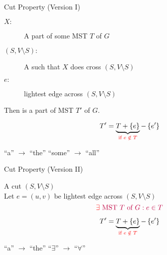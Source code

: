 
\begin{frame}{}
  \centerline{}
\end{frame}

\begin{frame}{}
  \begin{exampleblock}{Cut Property (Version I)}
    \begin{description}
      \item[$X:$] A part of some MST $T$ of $G$
      \item[$(S, V \setminus S):$] A  such that $X$ does  cross $(S, V \setminus S)$
    ­ \item[$e:$]  lightest edge across $(S, V \setminus S)$
    \end{description}

    \pause
    \vspace{0.30cm}
    \centerline{Then  is a part of  MST $T'$ of $G$.}
  \end{exampleblock}

  \pause
  \vspace{0.60cm}
  \centerline{}
\end{frame}

\begin{frame}{}
  \centerline{}

  \pause
  \vspace{0.30cm}

  \pause
  \[
    T' = \underbrace{T + \left\{e\right\}}_{\textcolor{red}{\text{if } e \;\notin\; T}} - \left\{e'\right\}
  \]

  \pause
  \centerline{``a'' $\to$ ``the'' \red{$\implies$} ``some'' $\to$ ``all''}
\end{frame}

\begin{frame}{}
  \begin{exampleblock}{Cut Property (Version II)}
    \begin{center}
      A cut $(S, V \setminus S)$ \\[6pt]
      Let $e = (u,v)$ be  lightest edge across $(S, V \setminus S)$
      \[
	\textcolor{purple}{\textcolor{red}{\exists} \text{ MST $T$ of } G: e \in T}
      \]
    \end{center}
  \end{exampleblock}


  \pause
  \vspace{-0.50cm}
  \[
    T' = \underbrace{T + \left\{e\right\}}_{\textcolor{red}{\text{if } e \;\notin\; T}} - \left\{e'\right\}
  \]
  
  \pause
  \centerline{``a'' $\to$ ``the'' \red{$\implies$} ``$\exists$'' $\to$ ``$\forall$''}
\end{frame}

